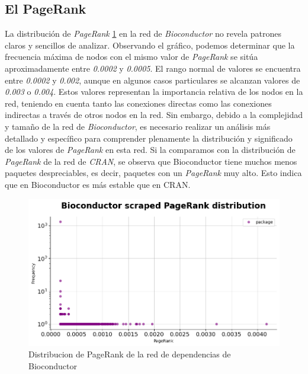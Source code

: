 \subsection{El PageRank}

La distribución de \textit{PageRank} \ref{fig:bioconductor_pagerank_dist} en la red de \textit{Bioconductor} no revela patrones claros
y sencillos de analizar. Observando el gráfico, podemos determinar que la frecuencia máxima de nodos
con el mismo valor de \textit{PageRank} se sitúa aproximadamente entre \textit{0.0002} y \textit{0.0005}.
El rango normal de valores se encuentra entre \textit{0.0002} y \textit{0.002}, aunque en algunos casos
particulares se alcanzan valores de \textit{0.003} o \textit{0.004}. Estos valores representan la importancia
relativa de los nodos en la red, teniendo en cuenta tanto las conexiones directas como las conexiones
indirectas a través de otros nodos en la red. Sin embargo, debido a la complejidad y tamaño de la red
de \textit{Bioconductor}, es necesario realizar un análisis más detallado y específico para comprender
plenamente la distribución y significado de los valores de \textit{PageRank} en esta red.
Si la comparamos con la distribución de \textit{PageRank} de la red de \textit{CRAN}, se observa que
Bioconductor tiene muchos menos paquetes despreciables, es decir, paquetes con un \textit{PageRank} muy
alto. Esto indica que en Bioconductor es más estable que en CRAN.

\begin{figure}[ht!]
    \begin{center}
        \includegraphics[width=1\textwidth]{img/bioconductor/pagerank_dist.png}
        \caption{Distribucion de PageRank de la red de dependencias de Bioconductor}
        \label{fig:bioconductor_pagerank_dist}
    \end{center}
\end{figure}


